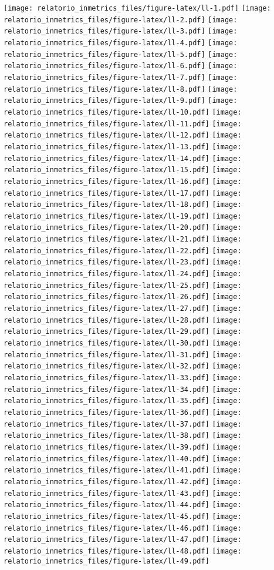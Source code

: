 \documentclass[]{book}
\begin{document}
\texttt{[image: relatorio\_inmetrics\_files/figure-latex/ll-1.pdf]} \texttt{[image: relatorio\_inmetrics\_files/figure-latex/ll-2.pdf]} \texttt{[image: relatorio\_inmetrics\_files/figure-latex/ll-3.pdf]} \texttt{[image: relatorio\_inmetrics\_files/figure-latex/ll-4.pdf]} \texttt{[image: relatorio\_inmetrics\_files/figure-latex/ll-5.pdf]} \texttt{[image: relatorio\_inmetrics\_files/figure-latex/ll-6.pdf]} \texttt{[image: relatorio\_inmetrics\_files/figure-latex/ll-7.pdf]} \texttt{[image: relatorio\_inmetrics\_files/figure-latex/ll-8.pdf]} \texttt{[image: relatorio\_inmetrics\_files/figure-latex/ll-9.pdf]} \texttt{[image: relatorio\_inmetrics\_files/figure-latex/ll-10.pdf]} \texttt{[image: relatorio\_inmetrics\_files/figure-latex/ll-11.pdf]} \texttt{[image: relatorio\_inmetrics\_files/figure-latex/ll-12.pdf]} \texttt{[image: relatorio\_inmetrics\_files/figure-latex/ll-13.pdf]} \texttt{[image: relatorio\_inmetrics\_files/figure-latex/ll-14.pdf]} \texttt{[image: relatorio\_inmetrics\_files/figure-latex/ll-15.pdf]} \texttt{[image: relatorio\_inmetrics\_files/figure-latex/ll-16.pdf]} \texttt{[image: relatorio\_inmetrics\_files/figure-latex/ll-17.pdf]} \texttt{[image: relatorio\_inmetrics\_files/figure-latex/ll-18.pdf]} \texttt{[image: relatorio\_inmetrics\_files/figure-latex/ll-19.pdf]} \texttt{[image: relatorio\_inmetrics\_files/figure-latex/ll-20.pdf]} \texttt{[image: relatorio\_inmetrics\_files/figure-latex/ll-21.pdf]} \texttt{[image: relatorio\_inmetrics\_files/figure-latex/ll-22.pdf]} \texttt{[image: relatorio\_inmetrics\_files/figure-latex/ll-23.pdf]} \texttt{[image: relatorio\_inmetrics\_files/figure-latex/ll-24.pdf]} \texttt{[image: relatorio\_inmetrics\_files/figure-latex/ll-25.pdf]} \texttt{[image: relatorio\_inmetrics\_files/figure-latex/ll-26.pdf]} \texttt{[image: relatorio\_inmetrics\_files/figure-latex/ll-27.pdf]} \texttt{[image: relatorio\_inmetrics\_files/figure-latex/ll-28.pdf]} \texttt{[image: relatorio\_inmetrics\_files/figure-latex/ll-29.pdf]} \texttt{[image: relatorio\_inmetrics\_files/figure-latex/ll-30.pdf]} \texttt{[image: relatorio\_inmetrics\_files/figure-latex/ll-31.pdf]} \texttt{[image: relatorio\_inmetrics\_files/figure-latex/ll-32.pdf]} \texttt{[image: relatorio\_inmetrics\_files/figure-latex/ll-33.pdf]} \texttt{[image: relatorio\_inmetrics\_files/figure-latex/ll-34.pdf]} \texttt{[image: relatorio\_inmetrics\_files/figure-latex/ll-35.pdf]} \texttt{[image: relatorio\_inmetrics\_files/figure-latex/ll-36.pdf]} \texttt{[image: relatorio\_inmetrics\_files/figure-latex/ll-37.pdf]} \texttt{[image: relatorio\_inmetrics\_files/figure-latex/ll-38.pdf]} \texttt{[image: relatorio\_inmetrics\_files/figure-latex/ll-39.pdf]} \texttt{[image: relatorio\_inmetrics\_files/figure-latex/ll-40.pdf]} \texttt{[image: relatorio\_inmetrics\_files/figure-latex/ll-41.pdf]} \texttt{[image: relatorio\_inmetrics\_files/figure-latex/ll-42.pdf]} \texttt{[image: relatorio\_inmetrics\_files/figure-latex/ll-43.pdf]} \texttt{[image: relatorio\_inmetrics\_files/figure-latex/ll-44.pdf]} \texttt{[image: relatorio\_inmetrics\_files/figure-latex/ll-45.pdf]} \texttt{[image: relatorio\_inmetrics\_files/figure-latex/ll-46.pdf]} \texttt{[image: relatorio\_inmetrics\_files/figure-latex/ll-47.pdf]} \texttt{[image: relatorio\_inmetrics\_files/figure-latex/ll-48.pdf]} \texttt{[image: relatorio\_inmetrics\_files/figure-latex/ll-49.pdf]} 
\end{document}
